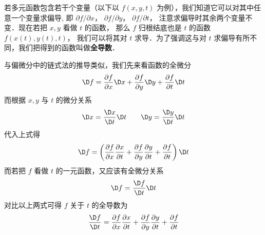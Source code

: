 
若多元函数包含若干个变量（以下以 $f(x,y,t)$ 为例），我们知道它可以对其中任意一个变量求偏导, 即 $\partial f/\partial x$，  $\partial f/\partial y$，  $\partial f/\partial t$， 注意求偏导时其余两个变量不变．现在若把 $x,y$ 看做 $t$ 的函数， 那么 $f$ 归根结底也是 $t$ 的函数 $f(x(t),y(t),t)$， 我们可以将其对 $t$ 求导．为了强调这与对 $t$ 求偏导有所不同，我们把得到的函数叫做\textbf{全导数}．

与偏微分中的链式法的推导类似，我们先来看函数的全微分
\begin{equation}
\D f = \frac{{\partial f}}{{\partial x}}\D x + \frac{{\partial f}}{{\partial y}}\D y + \frac{{\partial f}}{{\partial t}}\D t
\end{equation}
而根据 $x,y$ 与 $t$ 的微分关系
\begin{equation}
\D x = \frac{{\D x}}{{\D t}}\D t \qquad  \D y = \frac{{\D y}}{{\D t}}\D t
\end{equation}
代入上式得
\begin{equation}
\D f = \left( {\frac{{\partial f}}{{\partial x}}\frac{{\partial x}}{{\partial t}} + \frac{{\partial f}}{{\partial y}}\frac{{\partial y}}{{\partial t}} + \frac{{\partial f}}{{\partial t}}} \right)\D t
\end{equation}
而若把 $f$ 看做 $t$ 的一元函数，又应该有全微分关系
\begin{equation}
\D f = \frac{\D f}{\D t} \D t
\end{equation}
对比以上两式可得 $f$ 关于 $t$ 的全导数为
\begin{equation}
\frac{{\D f}}{{\D t}} = \frac{{\partial f}}{{\partial x}}\frac{{\partial x}}{{\partial t}} + \frac{{\partial f}}{{\partial y}}\frac{{\partial y}}{{\partial t}} + \frac{{\partial f}}{{\partial t}}
\end{equation}

